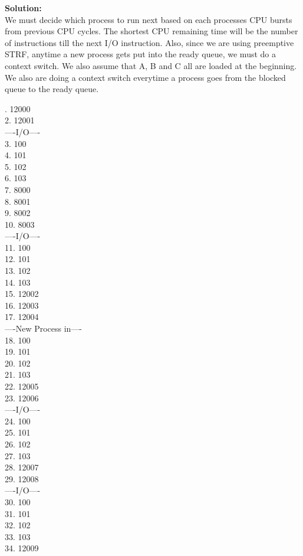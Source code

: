 \documentclass[12pt]{article}
\begin{document}
{\bf Solution:}\\

We must decide which process to run next based on each processes CPU bursts from previous CPU cycles. The shortest CPU remaining time will be the number of instructions till the next I/O instruction. Also, since we are using preemptive STRF, anytime a new process gets put into the ready queue, we must do a context switch. We also assume that A, B and C all are loaded at the beginning. We also are doing a context switch everytime a process goes from the blocked queue to the ready queue. 

. 12000\\
2. 12001\\
----I/O----\\
3. 100\\
4. 101\\
5. 102\\
6. 103\\
7. 8000\\
8. 8001\\
9. 8002\\
10. 8003\\
----I/O----\\
11. 100\\
12. 101\\
13. 102\\
14. 103\\
15. 12002\\
16. 12003\\
17. 12004\\
----New Process in----\\
18. 100\\
19. 101\\
20. 102\\
21. 103\\
22. 12005\\
23. 12006\\
----I/O----\\
24. 100\\
25. 101\\
26. 102\\
27. 103\\
28. 12007\\
29. 12008\\
----I/O----\\
30. 100\\
31. 101\\
32. 102\\
33. 103\\
34. 12009\\
\end{document}
